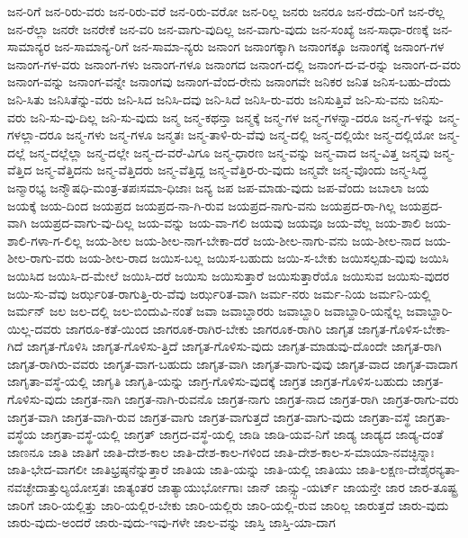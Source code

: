 {ಜನ-ರಿಗೆ
ಜನ-ರಿರು-ವರು
ಜನ-ರಿರು-ವರೆ
ಜನ-ರಿರು-ವರೋ
ಜನ-ರಿಲ್ಲ
ಜನರು
ಜನರೂ
ಜನ-ರೆದು-ರಿಗೆ
ಜನ-ರೆಲ್ಲ
ಜನ-ರೆಲ್ಲಾ
ಜನರೇ
ಜನರೇಕೆ
ಜನ-ವರಿ
ಜನ-ವಾಗು-ವುದಿಲ್ಲ
ಜನ-ವಾಗು-ವುದು
ಜನ-ಸಂಖ್ಯೆ
ಜನ-ಸಾಧಾ-ರಣಕ್ಕೆ
ಜನ-ಸಾಮಾನ್ಯರ
ಜನ-ಸಾಮಾನ್ಯ-ರಿಗೆ
ಜನ-ಸಾಮಾ-ನ್ಯರು
ಜನಾಂಗ
ಜನಾಂಗಕ್ಕಾಗಿ
ಜನಾಂಗಕ್ಕೂ
ಜನಾಂಗಕ್ಕೆ
ಜನಾಂಗ-ಗಳ
ಜನಾಂಗ-ಗಳ-ವರು
ಜನಾಂಗ-ಗಳು
ಜನಾಂಗ-ಗಳೂ
ಜನಾಂಗದ
ಜನಾಂಗ-ದಲ್ಲಿ
ಜನಾಂಗ-ದ-ವ-ರನ್ನು
ಜನಾಂಗ-ದ-ವರು
ಜನಾಂಗ-ವನ್ನು
ಜನಾಂಗ-ವನ್ನೇ
ಜನಾಂಗವು
ಜನಾಂಗ-ವೆಂದ-ರೇನು
ಜನಾಂಗವೇ
ಜನಿಕರ
ಜನಿತ
ಜನಿಸ-ಬಹು-ದೆಂದು
ಜನಿ-ಸಿತು
ಜನಿಸಿತೆನ್ನು-ವರು
ಜನಿ-ಸಿದ
ಜನಿಸಿ-ದವು
ಜನಿ-ಸಿದೆ
ಜನಿಸಿ-ರು-ವರು
ಜನಿಸುತ್ತಿವೆ
ಜನಿ-ಸು-ವನು
ಜನಿಸು-ವರು
ಜನಿ-ಸು-ವು-ದಿಲ್ಲ
ಜನಿ-ಸು-ವುದು
ಜನ್ಮ
ಜನ್ಮ-ಕಥನ್ತಾ
ಜನ್ಮಕ್ಕೆ
ಜನ್ಮ-ಗಳ
ಜನ್ಮ-ಗಳನ್ನಾ-ದರೂ
ಜನ್ಮ-ಗ-ಳನ್ನು
ಜನ್ಮ-ಗಳಲ್ಲಾ-ದರೂ
ಜನ್ಮ-ಗಳು
ಜನ್ಮ-ಗಳೂ
ಜನ್ಮತಃ
ಜನ್ಮ-ತಾಳಿ-ರು-ವೆವು
ಜನ್ಮ-ದಲ್ಲಿ
ಜನ್ಮ-ದಲ್ಲಿಯೇ
ಜನ್ಮ-ದಲ್ಲಿಯೋ
ಜನ್ಮ-ದಲ್ಲೆ
ಜನ್ಮ-ದಲ್ಲೆಲ್ಲಾ
ಜನ್ಮ-ದಲ್ಲೇ
ಜನ್ಮ-ದ-ವರೆ-ವಿಗೂ
ಜನ್ಮ-ಧಾರಣ
ಜನ್ಮ-ವನ್ನು
ಜನ್ಮ-ವಾದ
ಜನ್ಮ-ವಿತ್ತ
ಜನ್ಮವು
ಜನ್ಮ-ವೆತ್ತಿದ
ಜನ್ಮ-ವೆತ್ತಿದನು
ಜನ್ಮ-ವೆತ್ತಿದರು
ಜನ್ಮ-ವೆತ್ತಿದ್ದ
ಜನ್ಮ-ವೆತ್ತಿರ-ರು-ವುದು
ಜನ್ಮವೇ
ಜನ್ಮ-ವೊಂದು
ಜನ್ಮ-ಸಿದ್ಧ
ಜನ್ಮಾರಭ್ಯ
ಜನ್ಮೌಷಧಿ-ಮಂತ್ರ-ತಪಃಸಮಾ-ಧಿಜಾಃ
ಜನ್ಯ
ಜಪ
ಜಪ-ಮಾಡು-ವುದು
ಜಪ-ವೆಂದು
ಜಬಾಲಾ
ಜಯ
ಜಯಕ್ಕೆ
ಜಯ-ದಿಂದ
ಜಯಪ್ರದ
ಜಯಪ್ರದ-ನಾ-ಗಿ-ರುವ
ಜಯಪ್ರದ-ನಾಗು-ವನು
ಜಯಪ್ರದ-ರಾ-ಗಿಲ್ಲ
ಜಯಪ್ರದ-ವಾಗಿ
ಜಯಪ್ರದ-ವಾಗು-ವು-ದಿಲ್ಲ
ಜಯ-ವನ್ನು
ಜಯ-ವಾ-ಗಲಿ
ಜಯವು
ಜಯವೂ
ಜಯ-ವೆಲ್ಲ
ಜಯ-ಶಾಲಿ
ಜಯ-ಶಾಲಿ-ಗಳಾ-ಗ-ಲಿಲ್ಲ
ಜಯ-ಶೀಲ
ಜಯ-ಶೀಲ-ನಾಗ-ಬೇಕಾ-ದರೆ
ಜಯ-ಶೀಲ-ನಾಗು-ವನು
ಜಯ-ಶೀಲ-ನಾದ
ಜಯ-ಶೀಲ-ರಾಗು-ವರು
ಜಯ-ಶೀಲ-ರಾದ
ಜಯಿಸ-ಬಲ್ಲ
ಜಯಿಸ-ಬಹುದು
ಜಯಿ-ಸ-ಬೇಕು
ಜಯಿಸಲ್ಪಡು-ವುವು
ಜಯಿಸಿ
ಜಯಿಸಿದ
ಜಯಿಸಿ-ದ-ಮೇಲೆ
ಜಯಿಸಿ-ದರೆ
ಜಯಿಸು
ಜಯಿಸುತ್ತಾರೆ
ಜಯಿಸುತ್ತಾರೆಯೊ
ಜಯಿಸುವ
ಜಯಿಸು-ವುದರ
ಜಯಿ-ಸು-ವೆವು
ಜರ್ಝರಿತ-ರಾಗುತ್ತಿ-ರು-ವೆವು
ಜರ್ಝರಿತ-ವಾಗಿ
ಜರ್ಮ-ನರು
ಜರ್ಮ-ನಿಯ
ಜರ್ಮನಿ-ಯಲ್ಲಿ
ಜರ್ಮನ್
ಜಲ
ಜಲ-ದಲ್ಲಿ
ಜಲ-ಬಿಂದುವಿ-ನಂತೆ
ಜವಾ
ಜವಾಬ್ದಾರರು
ಜವಾಬ್ದಾರಿ
ಜವಾಬ್ದಾರಿ-ಯನ್ನೆಲ್ಲ
ಜವಾಬ್ದಾರಿ-ಯಿಲ್ಲ-ದವರು
ಜಾಗರೂ-ಕತೆ-ಯಿಂದ
ಜಾಗರೂಕ-ರಾಗಿರ-ಬೇಕು
ಜಾಗರೂಕ-ರಾಗಿರಿ
ಜಾಗೃತ
ಜಾಗೃತ-ಗೊಳಿಸ-ಬೇಕಾ-ಗಿದೆ
ಜಾಗೃತ-ಗೊಳಿಸಿ
ಜಾಗೃತ-ಗೊಳಿಸು-ತ್ತಿದೆ
ಜಾಗೃತ-ಗೊಳಿಸು-ವುದು
ಜಾಗೃತ-ಮಾಡುವು-ದೊಂದೇ
ಜಾಗೃತ-ರಾಗಿ
ಜಾಗೃತ-ರಾಗಿರು-ವವರು
ಜಾಗೃತ-ವಾಗ-ಬಹುದು
ಜಾಗೃತ-ವಾಗಿ
ಜಾಗೃತ-ವಾಗು-ವುವು
ಜಾಗೃತ-ವಾದ
ಜಾಗೃತ-ವಾದಾಗ
ಜಾಗೃತಾ-ವಸ್ಥೆ-ಯಲ್ಲಿ
ಜಾಗೃತಿ
ಜಾಗೃತಿ-ಯನ್ನು
ಜಾಗ್ರ-ಗೊಳಿಸು-ವುದಕ್ಕೆ
ಜಾಗ್ರತ
ಜಾಗ್ರತ-ಗೊಳಿಸ-ಬಹುದು
ಜಾಗ್ರತ-ಗೊಳಿಸು-ವುದು
ಜಾಗ್ರತ-ನಾಗಿ
ಜಾಗ್ರತ-ನಾಗಿ-ರುವನೊ
ಜಾಗ್ರತ-ನಾಗು
ಜಾಗ್ರತ-ನಾದ
ಜಾಗ್ರತ-ರಾಗಿ
ಜಾಗ್ರತ-ರಾಗು-ವರು
ಜಾಗ್ರತ-ವಾಗಿ
ಜಾಗ್ರತ-ವಾಗಿ-ರುವ
ಜಾಗ್ರತ-ವಾಗು
ಜಾಗ್ರತ-ವಾಗುತ್ತದೆ
ಜಾಗ್ರತ-ವಾಗು-ವುದು
ಜಾಗ್ರತಾ-ವಸ್ಥೆ
ಜಾಗ್ರತಾ-ವಸ್ಥೆಯ
ಜಾಗ್ರತಾ-ವಸ್ಥೆ-ಯಲ್ಲಿ
ಜಾಗ್ರತ್
ಜಾಗ್ರದ-ವಸ್ಥೆ-ಯಲ್ಲಿ
ಜಾಡಿ
ಜಾಡಿ-ಯವ-ನಿಗೆ
ಜಾಡ್ಯ
ಜಾಡ್ಯದ
ಜಾಡ್ಯ-ದಂತೆ
ಜಾಣನೂ
ಜಾತಿ
ಜಾತಿಗೆ
ಜಾತಿ-ದೇಶ-ಕಾಲ
ಜಾತಿ-ದೇಶ-ಕಾಲ-ಗಳಿಂದ
ಜಾತಿ-ದೇಶ-ಕಾಲ-ಸ-ಮಾಯಾ-ನವಚ್ಛಿನ್ನಾಃ
ಜಾತಿ-ಭೇದ-ವಾಗಲೀ
ಜಾತಿಭ್ರಷ್ಠನೆನ್ನುತ್ತಾರೆ
ಜಾತಿಯ
ಜಾತಿ-ಯನ್ನು
ಜಾತಿ-ಯಲ್ಲಿ
ಜಾತಿಯು
ಜಾತಿ-ಲಕ್ಷಣ-ದೇಶೈರನ್ಯತಾ-ನವಚ್ಛೇದಾತ್ತುಲ್ಯಯೋಸ್ತತಃ
ಜಾತ್ಯಂತರ
ಜಾತ್ಯಾಯುರ್ಭೋಗಾಃ
ಜಾನ್
ಜಾನ್ಸ್ಟು-ಯರ್ಟ್
ಜಾಯನ್ತೇ
ಜಾರ
ಜಾರ-ತೂಷ್ಟ್ರ
ಜಾರಿಗೆ
ಜಾರಿ-ಯಲ್ಲಿತ್ತು
ಜಾರಿ-ಯಲ್ಲಿರ-ಬೇಕು
ಜಾರಿ-ಯಲ್ಲಿರು
ಜಾರಿ-ಯಲ್ಲಿ-ರುವ
ಜಾರಿಲ್ಲ
ಜಾರುತ್ತದೆ
ಜಾರು-ವುದು
ಜಾರು-ವುದು-ಅಂದರೆ
ಜಾರು-ವುದು-ಇವು-ಗಳೇ
ಜಾಲ-ವನ್ನು
ಜಾಸ್ತಿ
ಜಾಸ್ತಿ-ಯಾ-ದಾಗ
}
